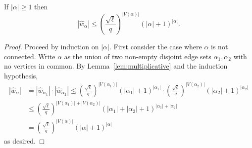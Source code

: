 \documentclass{article}
\begin{document}
\begin{lemma}\label{lem:w-bound}
If $|\alpha| \ge 1$ then
\[ |\hat{w}_\alpha| \le \left(\frac{\sqrt \ell}{q}\right)^{|V(\alpha)|} (|\alpha|+1)^{|\alpha|}. \]
\end{lemma}

\begin{proof}
Proceed by induction on $|\alpha|$. First consider the case where $\alpha$ is not connected. Write $\alpha$ as the union of two non-empty disjoint edge sets $\alpha_1, \alpha_2$ with no vertices in common. By Lemma~\ref{lem:multiplicative} and the induction hypothesis,
\begin{align*}
|\hat{w}_\alpha| &= |\hat{w}_{\alpha_1}| \cdot |\hat{w}_{\alpha_2}| \le \left(\frac{\sqrt \ell}{q}\right)^{|V(\alpha_1)|} (|\alpha_1|+1)^{|\alpha_1|} \cdot \left(\frac{\sqrt \ell}{q}\right)^{|V(\alpha_2)|} (|\alpha_2|+1)^{|\alpha_2|} \\
&\le \left(\frac{\sqrt \ell}{q}\right)^{|V(\alpha_1)|+|V(\alpha_2)|} (|\alpha_1|+|\alpha_2|+1)^{|\alpha_1|+|\alpha_2|} \\
&= \left(\frac{\sqrt \ell}{q}\right)^{|V(\alpha)|} (|\alpha|+1)^{|\alpha|}
\end{align*}
as desired.


\end{proof}
\end{document}
